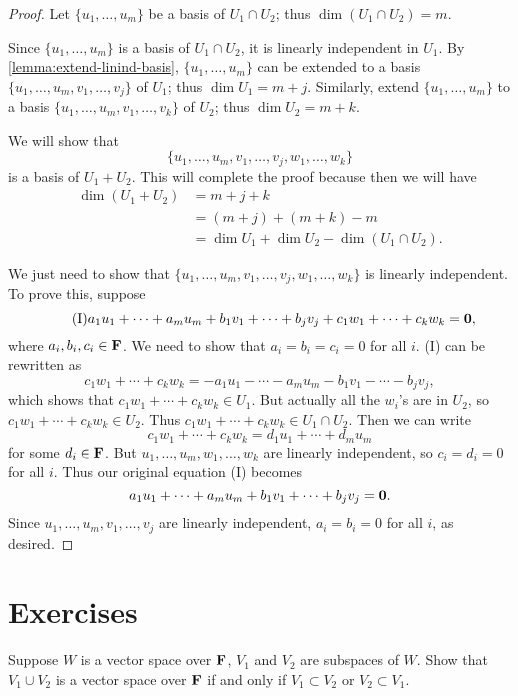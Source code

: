 \begin{proof}
Let $\{u_1,\dots,u_m\}$ be a basis of $U_1\cap U_2$; thus $\dim(U_1\cap U_2)=m$. 

Since $\{u_1,\dots,u_m\}$ is a basis of $U_1\cap U_2$, it is linearly independent in $U_1$. By \ref{lemma:extend-linind-basis}, $\{u_1,\dots,u_m\}$ can be extended to a basis $\{u_1,\dots,u_m,v_1,\dots,v_j\}$ of $U_1$; thus $\dim U_1=m+j$. Similarly, extend $\{u_1,\dots,u_m\}$ to a basis $\{u_1,\dots,u_m,v_1,\dots,v_k\}$ of $U_2$; thus $\dim U_2=m+k$.

We will show that
\[\{u_1,\dots,u_m,v_1,\dots,v_j,w_1,\dots,w_k\}\]
is a basis of $U_1+U_2$. This will complete the proof because then we will have
\begin{align*}
\dim(U_1+U_2)&=m+j+k\\
&=(m+j)+(m+k)-m\\
&=\dim U_1+\dim U_2-\dim(U_1\cap U_2).
\end{align*}

We just need to show that $\{u_1,\dots,u_m,v_1,\dots,v_j,w_1,\dots,w_k\}$ is linearly independent. To prove this, suppose
\begin{equation*}\tag{I}
a_1u_1+\cdots+a_mu_m+b_1v_1+\cdots+b_jv_j+c_1w_1+\cdots+c_kw_k=\vb{0},
\end{equation*}
where $a_i,b_i,c_i\in\mathbf F$. We need to show that $a_i=b_i=c_i=0$ for all $i$. (I) can be rewritten as
\[c_1w_1+\cdots+c_kw_k=-a_1u_1-\cdots-a_mu_m-b_1v_1-\cdots-b_jv_j,\]
which shows that $c_1w_1+\cdots+c_kw_k\in U_1$. But actually all the $w_i$'s are in $U_2$, so $c_1w_1+\cdots+c_kw_k\in U_2$. Thus $c_1w_1+\cdots+c_kw_k\in U_1\cap U_2$. Then we can write
\[c_1w_1+\cdots+c_kw_k=d_1u_1+\cdots+d_mu_m\]
for some $d_i\in\mathbf F$. But $u_1,\dots,u_m,w_1,\dots,w_k$ are linearly independent, so $c_i=d_i=0$ for all $i$. Thus our original equation (I) becomes
\[a_1u_1+\cdots+a_mu_m+b_1v_1+\cdots+b_jv_j=\vb{0}.\]
Since $u_1,\dots,u_m,v_1,\dots,v_j$ are linearly independent, $a_i=b_i=0$ for all $i$, as desired.
\end{proof}
\pagebreak

\section*{Exercises}
\begin{exercise}
Suppose $W$ is a vector space over $\mathbf F$, $V_1$ and $V_2$ are subspaces of $W$. Show that $V_1\cup V_2$ is a vector space over $\mathbf F$ if and only if $V_1\subset V_2$ or $V_2\subset V_1$.
\end{exercise}

